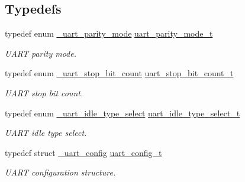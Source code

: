 \subsection*{Typedefs}
\begin{DoxyCompactItemize}
\item 
\mbox{\label{group__uart__driver_ga3d74bf70252b21a0dd19d61587ed320c}} 
typedef enum \mbox{\hyperlink{group__uart__driver_gadf9f66755acc340eab030e1a48e35e10}{\+\_\+uart\+\_\+parity\+\_\+mode}} \mbox{\hyperlink{group__uart__driver_ga3d74bf70252b21a0dd19d61587ed320c}{uart\+\_\+parity\+\_\+mode\+\_\+t}}
\begin{DoxyCompactList}\small\item\em U\+A\+RT parity mode. \end{DoxyCompactList}\item 
\mbox{\label{group__uart__driver_ga1df1fcb3fcd2d2db0b7ea0189fd94554}} 
typedef enum \mbox{\hyperlink{group__uart__driver_ga3c656a4365cab1185398ff953272091e}{\+\_\+uart\+\_\+stop\+\_\+bit\+\_\+count}} \mbox{\hyperlink{group__uart__driver_ga1df1fcb3fcd2d2db0b7ea0189fd94554}{uart\+\_\+stop\+\_\+bit\+\_\+count\+\_\+t}}
\begin{DoxyCompactList}\small\item\em U\+A\+RT stop bit count. \end{DoxyCompactList}\item 
\mbox{\label{group__uart__driver_ga9457d04cb0bf9c547babd63a4d20a9fa}} 
typedef enum \mbox{\hyperlink{group__uart__driver_gae658ead369268edf18141e1903d426f1}{\+\_\+uart\+\_\+idle\+\_\+type\+\_\+select}} \mbox{\hyperlink{group__uart__driver_ga9457d04cb0bf9c547babd63a4d20a9fa}{uart\+\_\+idle\+\_\+type\+\_\+select\+\_\+t}}
\begin{DoxyCompactList}\small\item\em U\+A\+RT idle type select. \end{DoxyCompactList}\item 
\mbox{\label{group__uart__driver_ga032da70848aac8bc9c3904a32bde5899}} 
typedef struct \mbox{\hyperlink{struct__uart__config}{\+\_\+uart\+\_\+config}} \mbox{\hyperlink{group__uart__driver_ga032da70848aac8bc9c3904a32bde5899}{uart\+\_\+config\+\_\+t}}
\begin{DoxyCompactList}\small\item\em U\+A\+RT configuration structure. \end{DoxyCompactList}\item 

\end{DoxyCompactItemize}
